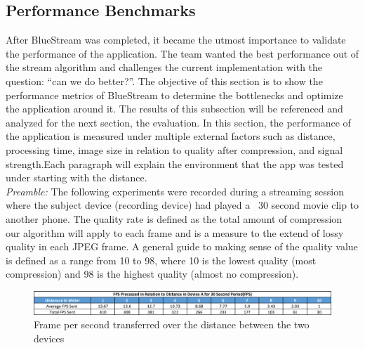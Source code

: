 \documentclass[a4paper,12pt]{article}
\begin{document}
\subsection{Performance Benchmarks}
After BlueStream was completed, it became the utmost importance to validate the performance of the application. The team wanted the best performance out of the stream algorithm and challenges the current implementation with the question: “can we do better?”. The objective of this section is to show the performance metrics of BlueStream to determine the bottlenecks and optimize the application around it. The results of this subsection will be referenced and analyzed for the next section, the evaluation. In this section, the performance of the application is measured under multiple external factors such as distance, processing time, image size in relation to quality after compression, and signal strength.Each paragraph will explain the environment that the app was tested under starting with the distance.\\

\textit{Preamble:} The following experiments were recorded during a streaming session where the subject device (recording device) had played a ~30 second movie clip to another phone. The quality rate is defined as the total amount of compression our algorithm will apply to each frame and is a measure to the extend of lossy quality in each JPEG frame. A general guide to making sense of the quality value is defined as a range from 10 to 98, where 10 is the lowest quality (most compression) and 98 is the highest quality (almost no compression).

\begin{figure}[h!]
\centering
\includegraphics[scale=.7]{Figures/Figure9.png}
\caption{Frame per second transferred over the distance between the two devices}
\label{fig:FPSoverDistance}
\end{figure}
\end{document}
